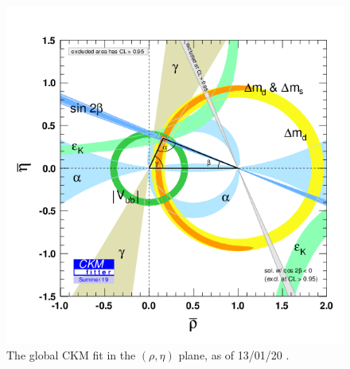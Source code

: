 \documentclass[a4paper,12pt]{article}
\begin{document}
\begin{figure}[H]
    \centering
    \includegraphics[scale=0.5]{rhoeta_large.png}
    \caption{\label{fig:ckmfitter} The global CKM fit in the $(\rho,\eta)$ plane, as of 13/01/20 \cite{g}.}
\end{figure}
\end{document}
